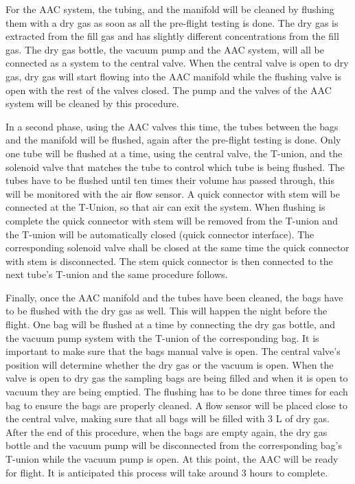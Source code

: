 For the AAC system, the tubing, and the manifold will be cleaned by flushing them with a dry gas as soon as all the pre-flight testing is done. The dry gas is extracted from the fill gas and has slightly different concentrations from the fill gas. The dry gas bottle, the vacuum pump and the AAC system, will all be connected as a system to the central valve. When the central valve is open to dry gas, dry gas will start flowing into the AAC manifold while the flushing valve is open with the rest of the valves closed. The pump and the valves of the AAC system will be cleaned by this procedure.

In a second phase, using the AAC valves this time, the tubes between the bags and the manifold will be flushed, again after the pre-flight testing is done. Only one tube will be flushed at a time, using the central valve, the T-union, and the solenoid valve that matches the tube to control which tube is being flushed. The tubes have to be flushed until ten times their volume has passed through, this will be monitored with the air flow sensor. A quick connector with stem will be connected at the T-Union, so that air can exit the system. When flushing is complete the quick connector with stem will be removed from the T-union and the T-union will be automatically closed (quick connector interface). The corresponding solenoid valve shall be closed at the same time the quick connector with stem is disconnected. The stem quick connector is then connected to the next tube's T-union and the same procedure follows. 
    
Finally, once the AAC manifold and the tubes have been cleaned, the bags have to be flushed with the dry gas as well. This will happen the night before the flight. One bag will be flushed at a time by connecting the dry gas bottle, and the vacuum pump system with the T-union of the corresponding bag. It is important to make sure that the bags manual valve is open. The central valve's position will determine whether the dry gas or the vacuum is open. When the valve is open to dry gas the sampling bags are being filled and when it is open to vacuum they are being emptied. The flushing has to be done three times for each bag to ensure the bags are properly cleaned. A flow sensor will be placed close to the central valve, making sure that all bags will be filled with 3 L of dry gas. After the end of this procedure, when the bags are empty again, the dry gas bottle and the vacuum pump will be disconnected from the corresponding bag's T-union while the vacuum pump is open. At this point, the AAC will be ready for flight. It is anticipated this process will take around 3 hours to complete.

